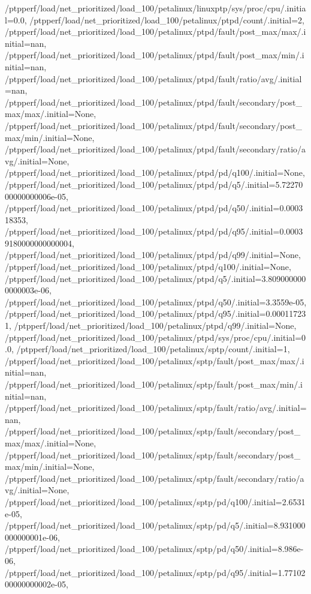 {    /ptpperf/load/net_prioritized/load_100/petalinux/linuxptp/sys/proc/cpu/.initial=0.0,
    /ptpperf/load/net_prioritized/load_100/petalinux/ptpd/count/.initial=2,
    /ptpperf/load/net_prioritized/load_100/petalinux/ptpd/fault/post_max/max/.initial=nan,
    /ptpperf/load/net_prioritized/load_100/petalinux/ptpd/fault/post_max/min/.initial=nan,
    /ptpperf/load/net_prioritized/load_100/petalinux/ptpd/fault/ratio/avg/.initial=nan,
    /ptpperf/load/net_prioritized/load_100/petalinux/ptpd/fault/secondary/post_max/max/.initial=None,
    /ptpperf/load/net_prioritized/load_100/petalinux/ptpd/fault/secondary/post_max/min/.initial=None,
    /ptpperf/load/net_prioritized/load_100/petalinux/ptpd/fault/secondary/ratio/avg/.initial=None,
    /ptpperf/load/net_prioritized/load_100/petalinux/ptpd/pd/q100/.initial=None,
    /ptpperf/load/net_prioritized/load_100/petalinux/ptpd/pd/q5/.initial=5.7227000000000006e-05,
    /ptpperf/load/net_prioritized/load_100/petalinux/ptpd/pd/q50/.initial=0.000318353,
    /ptpperf/load/net_prioritized/load_100/petalinux/ptpd/pd/q95/.initial=0.00039180000000000004,
    /ptpperf/load/net_prioritized/load_100/petalinux/ptpd/pd/q99/.initial=None,
    /ptpperf/load/net_prioritized/load_100/petalinux/ptpd/q100/.initial=None,
    /ptpperf/load/net_prioritized/load_100/petalinux/ptpd/q5/.initial=3.8090000000000003e-06,
    /ptpperf/load/net_prioritized/load_100/petalinux/ptpd/q50/.initial=3.3559e-05,
    /ptpperf/load/net_prioritized/load_100/petalinux/ptpd/q95/.initial=0.000117231,
    /ptpperf/load/net_prioritized/load_100/petalinux/ptpd/q99/.initial=None,
    /ptpperf/load/net_prioritized/load_100/petalinux/ptpd/sys/proc/cpu/.initial=0.0,
    /ptpperf/load/net_prioritized/load_100/petalinux/sptp/count/.initial=1,
    /ptpperf/load/net_prioritized/load_100/petalinux/sptp/fault/post_max/max/.initial=nan,
    /ptpperf/load/net_prioritized/load_100/petalinux/sptp/fault/post_max/min/.initial=nan,
    /ptpperf/load/net_prioritized/load_100/petalinux/sptp/fault/ratio/avg/.initial=nan,
    /ptpperf/load/net_prioritized/load_100/petalinux/sptp/fault/secondary/post_max/max/.initial=None,
    /ptpperf/load/net_prioritized/load_100/petalinux/sptp/fault/secondary/post_max/min/.initial=None,
    /ptpperf/load/net_prioritized/load_100/petalinux/sptp/fault/secondary/ratio/avg/.initial=None,
    /ptpperf/load/net_prioritized/load_100/petalinux/sptp/pd/q100/.initial=2.6531e-05,
    /ptpperf/load/net_prioritized/load_100/petalinux/sptp/pd/q5/.initial=8.931000000000001e-06,
    /ptpperf/load/net_prioritized/load_100/petalinux/sptp/pd/q50/.initial=8.986e-06,
    /ptpperf/load/net_prioritized/load_100/petalinux/sptp/pd/q95/.initial=1.7710200000000002e-05,
}
